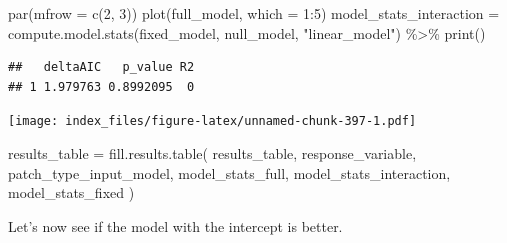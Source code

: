 \documentclass[
]{article}
\newenvironment{Shaded}{\begin{snugshade}}{\end{snugshade}}
\newcommand{\AttributeTok}[1]{\textcolor[rgb]{0.77,0.63,0.00}{#1}}
\newcommand{\DecValTok}[1]{\textcolor[rgb]{0.00,0.00,0.81}{#1}}
\newcommand{\FunctionTok}[1]{\textcolor[rgb]{0.00,0.00,0.00}{#1}}
\newcommand{\NormalTok}[1]{#1}
\newcommand{\OtherTok}[1]{\textcolor[rgb]{0.56,0.35,0.01}{#1}}
\newcommand{\SpecialCharTok}[1]{\textcolor[rgb]{0.00,0.00,0.00}{#1}}
\newcommand{\StringTok}[1]{\textcolor[rgb]{0.31,0.60,0.02}{#1}}
\begin{document}
\begin{Shaded}
\begin{Highlighting}[]
\FunctionTok{par}\NormalTok{(}\AttributeTok{mfrow =} \FunctionTok{c}\NormalTok{(}\DecValTok{2}\NormalTok{, }\DecValTok{3}\NormalTok{))}
\FunctionTok{plot}\NormalTok{(full\_model, }\AttributeTok{which =} \DecValTok{1}\SpecialCharTok{:}\DecValTok{5}\NormalTok{)}
\NormalTok{model\_stats\_interaction }\OtherTok{=} \FunctionTok{compute.model.stats}\NormalTok{(fixed\_model,}
\NormalTok{                                              null\_model,}
                                              \StringTok{"linear\_model"}\NormalTok{) }\SpecialCharTok{\%\textgreater{}\%}
  \FunctionTok{print}\NormalTok{()}
\end{Highlighting}
\end{Shaded}

\begin{verbatim}
##   deltaAIC   p_value R2
## 1 1.979763 0.8992095  0
\end{verbatim}

\texttt{[image: index\_files/figure-latex/unnamed-chunk-397-1.pdf]}

\begin{Shaded}
\begin{Highlighting}[]
\NormalTok{results\_table }\OtherTok{=} \FunctionTok{fill.results.table}\NormalTok{(}
\NormalTok{  results\_table,}
\NormalTok{  response\_variable,}
\NormalTok{  patch\_type\_input\_model,}
\NormalTok{  model\_stats\_full,}
\NormalTok{  model\_stats\_interaction,}
\NormalTok{  model\_stats\_fixed}
\NormalTok{)}
\end{Highlighting}
\end{Shaded}

Let's now see if the model with the intercept is better.
\end{document}
